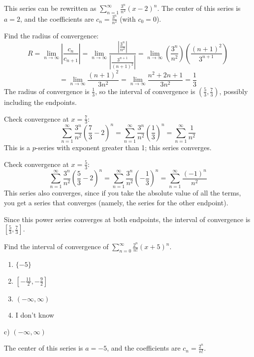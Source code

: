 \documentclass[addpoints,12pt,answers]{exam}
\begin{document}
\begin{questions}
\begin{solution}
    This series can be rewritten as $\displaystyle\sum_{n=1}^\infty\frac{3^n}{n^2}(x-2)^n$. The center of this series is $a=2$, and the coefficients are $\displaystyle c_n=\frac{3^n}{n^2}$ (with $c_0=0$).
    
    Find the radius of convergence:
    $$R=\lim_{n\to\infty}\left|\frac{c_n}{c_{n+1}}\right|=\lim_{n\to\infty}\frac{\left|\frac{3^n}{n^2}\right|}{\left|\frac{3^{n+1}}{(n+1)^2}\right|}=\lim_{n\to\infty}\left(\frac{3^n}{n^2}\right)\left(\frac{(n+1)^2}{3^{n+1}}\right)$$
    $$=\lim_{n\to\infty}\frac{(n+1)^2}{3n^2}=\lim_{n\to\infty}\frac{n^2+2n+1}{3n^2}=\frac{1}{3}$$
    The radius of convergence is $\displaystyle\frac{1}{3}$, so the interval of convergence is $\displaystyle\left(\frac{5}{3},\frac{7}{3}\right)$, possibly including the endpoints.
    
    Check convergence at $\displaystyle x=\frac{7}{3}$:
    $$\sum_{n=1}^\infty\frac{3^n}{n^2}\left(\frac{7}{3}-2\right)^n=\sum_{n=1}^\infty\frac{3^n}{n^2}\left(\frac{1}{3}\right)^n=\sum_{n=1}^\infty\frac{1}{n^2}$$
    This is a $p$-series with exponent greater than 1; this series converges.
    
    Check convergence at $\displaystyle x=\frac{5}{3}$:
    $$\sum_{n=1}^\infty\frac{3^n}{n^2}\left(\frac{5}{3}-2\right)^n=\sum_{n=1}^\infty\frac{3^n}{n^2}\left(-\frac{1}{3}\right)^n=\sum_{n=1}^\infty\frac{(-1)^n}{n^2}$$
    This series also converges, since if you take the absolute value of all the terms, you get a series that converges (namely, the series for the other endpoint).
    
    Since this power series converges at both endpoints, the interval of convergence is $\displaystyle\left[\frac{5}{3},\frac{7}{3}\right]$.
  \end{solution}
  \newpage
  \question
  Find the interval of convergence of $\displaystyle\sum_{n=0}^\infty\frac{2^n}{n!}(x+5)^n$.
  \begin{enumerate}[label=\alph*)]
    \item
    $\{-5\}$
    \item
    $\displaystyle\left[-\frac{11}{2},-\frac{9}{2}\right]$
    \item
    $(-\infty,\infty)$
    \item
    I don't know
  \end{enumerate}
  \begin{solution}
    c) $(-\infty,\infty)$
    
    The center of this series is $a=-5$, and the coefficients are $\displaystyle c_n=\frac{2^n}{n!}$.
      

\end{solution}
\end{questions}
\end{document}
